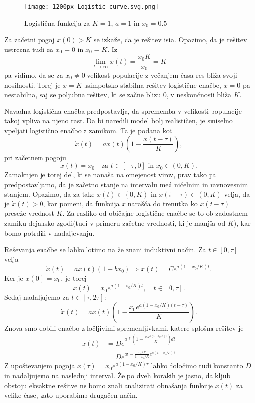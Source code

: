 \documentclass[12pt,a4paper]{amsart}
\theoremstyle{definition} %
\theoremstyle{plain} %
\begin{document}
\begin{figure}[h]
    \texttt{[image: 1200px-Logistic-curve.svg.png]}
    \caption{Logistična funkcija za $K=1$, $a=1$ in $x_0=0.5$}
\end{figure}

\noindent Za začetni pogoj $x(0)>K$ se izkaže, da je rešitev ista.
Opazimo, da je rešitev ustrezna tudi za $x_0=0$ in $x_0=K$. Iz 
\[\lim_{t\to\infty}x(t)=\frac{x_0K}{x_0}=K\]
pa vidimo, da se za $x_0\neq0$ velikost populacije z večanjem časa res bliža svoji nosilnosti. Torej je $x=K$ asimpotsko stabilna 
rešitev logistične enačbe, $x=0$ pa nestabilna, saj se poljubna rešitev, ki se začne blizu 0, v neskončnosti bliža $K$.


Navadna logistična enačba predpostavlja, da sprememba v velikosti populacije takoj vpliva na njeno rast. Da bi naredili 
model bolj realističen, je smiselno vpeljati logistično enačbo z zamikom. Ta je podana kot 
\[\dot{x}(t)=ax(t)\left(1-\frac{x(t-\tau)}{K}\right),\]
pri začetnem pogoju 
\[x(t)=x_0\quad\text{za }t\in[-\tau,0] \text{ in }x_0\in(0,K).\]
Zamaknjen je torej del, ki se nanaša na omejenost virov, prav tako pa predpostavljamo, da je začetno stanje na intervalu
med ničelnim in ravnovesnim stanjem. Opazimo, da za take $x(t)\in(0,K)$ in $x(t-\tau)\in(0,K)$ velja, da je
$\dot{x}(t)>0$, kar pomeni, da funkcija $x$ narašča do trenutka ko $x(t-\tau)$ preseže vrednost $K$. Za razliko od 
običajne logistične enačbe se to ob zadostnem zamiku dejansko zgodi(tudi v primeru začetne vrednosti, ki je manjša od $K$),
kar bomo potrdili v nadaljevanju.

Reševanja enačbe se lahko lotimo na že znani induktivni način. Za $t\in[0,\tau]$ velja 
\[\dot{x}(t)=ax(t)(1-bx_0) \Rightarrow x(t)=Ce^{a(1-x_0/K)t}.\]
Ker je $x(0)=x_0$, je torej 
\[x(t)=x_0e^{a(1-x_0/K)t}, \quad t\in[0,\tau].\]
Sedaj nadaljujemo za $t\in[\tau,2\tau]$:
\[\dot{x}(t)=ax(t)\left(1-\frac{x_0e^{a(1-x_0/K)(t-\tau)}}{K}\right).\]
Znova smo dobili enačbo z ločljivimi spremenljivkami, katere splošna rešitev je 
\begin{equation*}
    \begin{split}
        x(t) &= De^{a\int(1-\frac{x_0e^{a(1-x_0/K)t}}{K})dt} \\
             &= De^{at-\frac{x_0/K}{1-x_0/K}e^{a(1-x_0/K)t}}
    \end{split}
\end{equation*}
Z upoštevanjem pogoja $x(\tau)=x_0e^{a(1-x_0/K)\tau}$ lahko določimo tudi konstanto $D$ in nadaljujemo na naslednji 
interval. Že po dveh korakih je jasno, da kljub obstoju eksaktne rešitve ne bomo znali analizirati obnašanja funkcije 
$x(t)$ za velike čase, zato uporabimo drugačen način.
\end{document}
